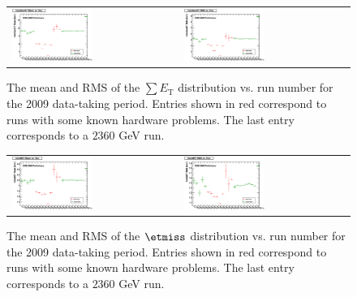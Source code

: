 \begin{figure}[h!]
  \centering
  \begin{tabular}{ll}
    \includegraphics[width=0.5\textwidth]{plots_METStability/h_caloSumetMean_vs_run.eps} &
    \includegraphics[width=0.5\textwidth]{plots_METStability/h_caloSumetRMS_vs_run.eps} \\
  \end{tabular}
 \caption{\small The mean and RMS of the $\sum E_\text{T}$ distribution vs. run number for the 2009 data-taking period.
          Entries shown in red correspond to runs with some known hardware problems. The last entry corresponds to a $2360$ GeV run.
          \label{fig:SumET_vs_run}}
      \end{figure}

\begin{figure}[h!]
  \centering
  \begin{tabular}{ll}
    \includegraphics[width=0.5\textwidth]{plots_METStability/h_calometPtMean_vs_run.eps} &
    \includegraphics[width=0.5\textwidth]{plots_METStability/h_calometPtRMS_vs_run.eps} \\
  \end{tabular}
  \caption{\small The mean and RMS of the $\etmiss$ distribution vs. run
    number for the 2009 data-taking period.  Entries shown in red
    correspond to runs with some known hardware problems. The last entry
    corresponds to a $2360$ GeV run.\label{fig:MET_vs_run}}
\end{figure}

